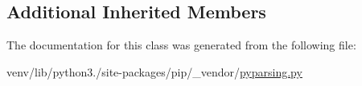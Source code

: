 \subsection*{Additional Inherited Members}


The documentation for this class was generated from the following file\+:\begin{DoxyCompactItemize}
\item 
venv/lib/python3./site-\/packages/pip/\+\_\+vendor/\hyperlink{pip_2__vendor_2pyparsing_8py}{pyparsing.\+py}\end{DoxyCompactItemize}
